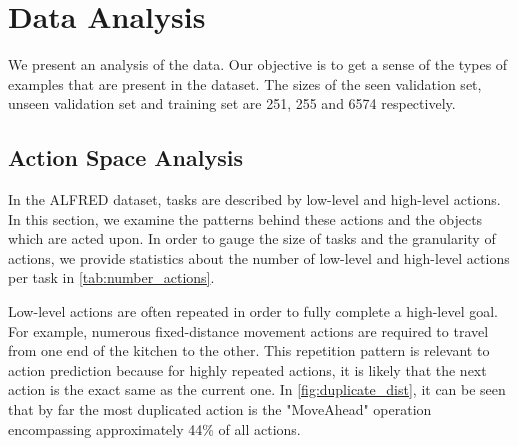 \documentclass[11pt,a4paper]{article}
\begin{document}
\begin{table}[]
    \centering
    \caption{Statistics on the number of low-level and high-level actions for the splits of the data.}
    \label{tab:number_actions}
\end{table}

\section{Data Analysis}
We present an analysis of the data. Our objective is to get a sense of the types of examples that are present in the dataset. The sizes of the seen validation set, unseen validation set and training set are 251, 255 and 6574 respectively.

\subsection{Action Space Analysis}

In the ALFRED dataset, tasks are described by low-level and high-level actions. In this section, we examine the patterns behind these actions and the objects which are acted upon. In order to gauge the size of tasks and the granularity of actions, we provide statistics about the number of low-level and high-level actions per task in \autoref{tab:number_actions}.

Low-level actions are often repeated in order to fully complete a high-level goal. For example, numerous fixed-distance movement actions are required to travel from one end of the kitchen to the other. This repetition pattern is relevant to action prediction because for highly repeated actions, it is likely that the next action is the exact same as the current one. In \autoref{fig:duplicate_dist}, it can be seen that by far the most duplicated action is the "MoveAhead" operation encompassing approximately 44\% of all actions.
\end{document}
